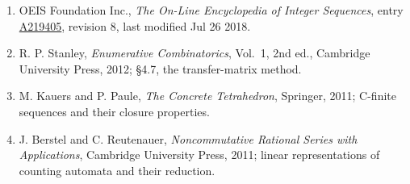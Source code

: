 \documentclass[11pt]{article}
\theoremstyle{definition}
\begin{document}
\begin{enumerate}

\item OEIS Foundation Inc., \emph{The On-Line Encyclopedia of Integer Sequences}, entry \href{https://oeis.org/A219405}{A219405}, revision 8, last modified Jul 26 2018.

\item R. P. Stanley, \emph{Enumerative Combinatorics}, Vol.~1, 2nd ed., Cambridge University Press, 2012; \S4.7, the transfer-matrix method.

\item M. Kauers and P. Paule, \emph{The Concrete Tetrahedron}, Springer, 2011; C-finite sequences and their closure properties.

\item J. Berstel and C. Reutenauer, \emph{Noncommutative Rational Series with Applications}, Cambridge University Press, 2011; linear representations of counting automata and their reduction.

\end{enumerate}
\end{document}
